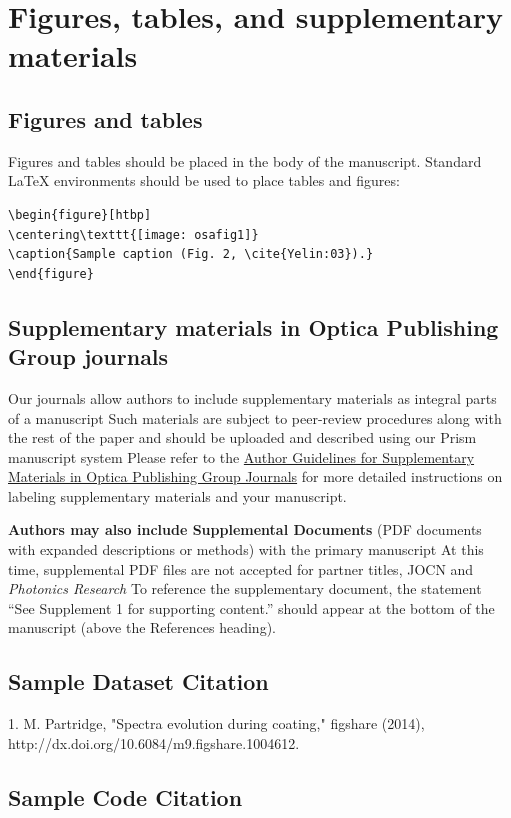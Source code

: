 \documentclass{osa-article}
\begin{document}
\section{Figures, tables, and supplementary materials}

\subsection{Figures and tables}
Figures and tables should be placed in the body of the manuscript.
Standard \LaTeX{} environments should be used to place tables and figures:
\begin{verbatim}
\begin{figure}[htbp]
\centering\texttt{[image: osafig1]}
\caption{Sample caption (Fig. 2, \cite{Yelin:03}).}
\end{figure}
\end{verbatim}

\subsection{Supplementary materials in Optica Publishing Group journals}
Our journals allow authors to include supplementary materials as integral parts of a manuscript
Such materials are subject to peer-review procedures along with the rest of the paper and should be uploaded and described using our Prism manuscript system
Please refer to the \href{https://opg.optica.org/submit/style/supplementary_materials.cfm}{Author Guidelines for Supplementary Materials in Optica Publishing Group Journals} for more detailed instructions on labeling supplementary materials and your manuscript.

\textbf{Authors may also include Supplemental Documents} (PDF documents with expanded descriptions or methods) with the primary manuscript
At this time, supplemental PDF files are not accepted for partner titles, JOCN and \emph{Photonics Research}
To reference the supplementary document, the statement ``See Supplement 1 for supporting content.'' should appear at the bottom of the manuscript (above the References heading).

\subsection{Sample Dataset Citation}

1. M. Partridge, "Spectra evolution during coating," figshare (2014), http://dx.doi.org/10.6084/m9.figshare.1004612.

\subsection{Sample Code Citation}
\end{document}
